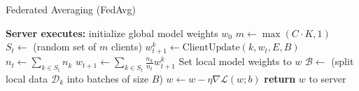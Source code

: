 \documentclass[conference]{IEEEtran}
\begin{document}
\begin{algorithm}[htbp]
\caption{Federated Averaging (FedAvg)}
\label{alg:fedavg}
\begin{algorithmic}[1]
\State \textbf{Server executes:}
\State initialize global model weights $w_0$
    \State $m \leftarrow \max(C \cdot K, 1)$ 
    \State $S_t \leftarrow$ (random set of $m$ clients)
        \State $w_{t+1}^k \leftarrow \text{ClientUpdate}(k, w_t, E, B)$
    \EndFor
    \State $n_t \leftarrow \sum_{k \in S_t} n_k$  
    \State $w_{t+1} \leftarrow \sum_{k \in S_t} \frac{n_k}{n_t} w_{t+1}^k$ 
\EndFor
\State
{} 
    \State Set local model weights to $w$
    \State $\mathcal{B} \leftarrow$ (split local data $\mathcal{D}_k$ into batches of size $B$)
            \State $w \leftarrow w - \eta \nabla \mathcal{L}(w; b)$ 
        \EndFor
    \EndFor
    \State \textbf{return} $w$ to server
\EndFunction
\end{algorithmic}
\end{algorithm}
\end{document}
